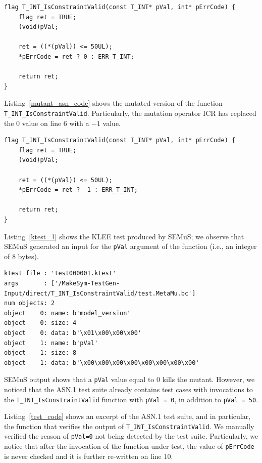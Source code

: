 \begin{lstlisting}[style=CStyle, float=t, caption=Original code for T\_INT\_IsConstraintValid., label=original_asn_code]
flag T_INT_IsConstraintValid(const T_INT* pVal, int* pErrCode) {
    flag ret = TRUE;
    (void)pVal;

    ret = ((*(pVal)) <= 50UL);
    *pErrCode = ret ? 0 : ERR_T_INT;

    return ret;
}
\end{lstlisting}

Listing~\ref{mutant_asn_code} shows the mutated version of the function \texttt{T\_INT\_IsConstraintValid}. Particularly, the mutation operator ICR has replaced the $0$ value on line 6 with a $-1$ value.

\begin{lstlisting}[style=CStyle, float=t, caption=Mutant code for T\_INT\_IsConstraintValid., label=mutant_asn_code]
flag T_INT_IsConstraintValid(const T_INT* pVal, int* pErrCode) {
    flag ret = TRUE;
    (void)pVal;

    ret = ((*(pVal)) <= 50UL);
    *pErrCode = ret ? -1 : ERR_T_INT;

    return ret;
}
\end{lstlisting}


Listing~\ref{ktest_1} shows the KLEE test produced by SEMuS; we observe that SEMuS generated an input for the \texttt{pVal} argument of the function (i.e., an integer of 8 bytes).

\begin{lstlisting}[language={}, float=t, caption=Klee-test output, label=ktest_1]
ktest file : 'test000001.ktest'
args       : ['/MakeSym-TestGen-Input/direct/T_INT_IsConstraintValid/test.MetaMu.bc']
num objects: 2
object    0: name: b'model_version'
object    0: size: 4
object    0: data: b'\x01\x00\x00\x00'
object    1: name: b'pVal'
object    1: size: 8
object    1: data: b'\x00\x00\x00\x00\x00\x00\x00\x00'
\end{lstlisting}

SEMuS output shows that a \texttt{pVal} value equal to 0 kills the mutant.
However, we noticed that the ASN.1 test suite already contains test cases with invocations to the \texttt{T\_INT\_IsConstraintValid} function with \texttt{pVal = 0}, in addition to \texttt{pVal = 50}.

Listing~\ref{test_code} shows an excerpt of the ASN.1 test suite, and in particular, the function that verifies the output of \texttt{T\_INT\_IsConstraintValid}.
We manually verified the reason of \texttt{pVal=0} not being detected by the test suite. Particularly, we notice that after the invocation of the function under test, the value of \texttt{pErrCode} is never checked and it is further re-written on line 10.

